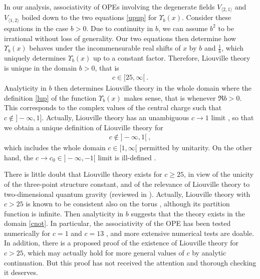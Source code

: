 \documentclass[12pt,a4paper,notitlepage]{report}
\numberwithin{equation}{section}
\theoremstyle{break}
\begin{document}
In our analysis, associativity of OPEs involving the degenerate fields $V_{\langle 2,1\rangle}$ and $V_{\langle 1,2\rangle}$ boiled down to the two equations 
\eqref{upup} for $\Upsilon_b(x)$.
Consider these equations 
in the case $b>0$.
Due to continuity in $b$, we can assume $b^2$ to be irrational without loss of generality.
Our two equations then determine how $\Upsilon_b(x)$ behaves under the incommensurable real shifts of $x$ by $b$ and $\frac{1}{b}$, which uniquely determines $\Upsilon_b(x)$ up to a constant factor.
Therefore, Liouville theory is unique in the domain $b>0$, that is 
\begin{align}
 c \in [25,\infty[ \ .
\end{align}
Analyticity in $b$ then determines Liouville theory in the whole domain where the definition \eqref{lup} of the function $\Upsilon_b(x)$ makes sense, that is whenever $\Re b>0$.
This corresponds to the complex values of the central charge such that $c\notin ]-\infty,1]$.
Actually, Liouville theory has an unambiguous $c\rightarrow 1$ limit \cite{sch03}, so that we obtain a unique definition of Liouville theory for
\begin{align}
 c\notin ]-\infty,1[ \ ,
\label{cnot}
\end{align}
which includes the whole domain $c\in [1,\infty[$ permitted by unitarity.
On the other hand, the $c\rightarrow c_0\in ]-\infty,-1[$ limit is ill-defined \cite{zam05}. 

There is little doubt that Liouville theory exists for $c\geq 25$, in view of the unicity of the three-point structure constant, and of the relevance of Liouville theory to two-dimensional quantum gravity (reviewed in \cite{zam05}). Actually, Liouville theory with $c> 25$ is known to be consistent also on the torus \cite{hjs09}, although its partition function is infinite. 
Then analyticity in $b$ suggests that the theory exists in the domain \eqref{cnot}.
In particular, the associativity of the OPE has been tested numerically for $c=1$ \cite{rw01} and $c=13$ \cite{zz95}, and more extensive numerical tests are doable.
In addition, there is a proposed proof \cite{tes03b} of the existence of Liouville theory for $c>25$, which may actually hold for more general values of $c$ by analytic continuation.
But this proof has not received the attention and thorough checking it deserves.
\end{document}
